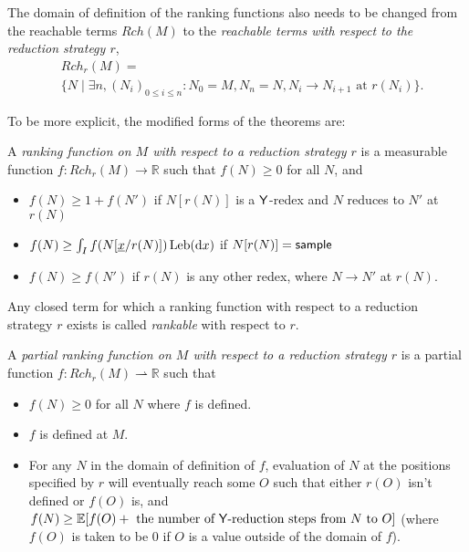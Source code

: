 The domain of definition of the ranking functions also needs to be changed from the reachable terms $Rch(M)$ to the \emph{reachable terms with respect to the reduction strategy $r$},
\begin{align*}
& Rch_r(M) = \\ & \{N \mid \exists n, (N_i)_{0 \leq i \leq n}: N_0 = M, N_n = N, N_i \to N_{i+1} \text{ at } r(N_i)\}.
\end{align*}

To be more explicit, the modified forms of the theorems are:
\begin{definition}\rm
A \emph{ranking function on $M$ with respect to a reduction strategy $r$} is a measurable function $f:\mathit{Rch}_r(M) \to \mathbb{R}$ such that $f(N) \geq 0$ for all $N$, and
\begin{itemize}
    \item $f(N) \geq 1+ f(N')$ if $N[r(N)]$ is a $\mathsf{Y}$-redex and $N$ reduces to $N'$ at $r(N)$
    \item $f(N) \geq \int_I f(N[\underline{x}/r(N)]) \, \mathrm{Leb}(\mathrm{d}x)$ if $N[r(N)] = \mathsf{sample}$

    \item $f(N) \geq f(N')$ if $r(N)$ is any other redex, where $N \to N'$ at $r(N)$.
\end{itemize}
Any closed term for which a ranking function with respect to a reduction strategy $r$ exists is called \emph{rankable} with respect to $r$. 
\end{definition}

\begin{definition}
A \emph{partial ranking function on $M$ with respect to a reduction strategy $r$} is a partial function $f : Rch_r(M) \rightharpoonup \mathbb R$ such that
\begin{itemize}
    \item $f(N) \geq 0$ for all $N$ where $f$ is defined.
    \item $f$ is defined at $M$.
    \item For any $N$ in the domain of definition of $f$, evaluation of $N$ at the positions specified by $r$ will eventually reach some $O$ such that either $r(O)$ isn't defined or $f(O)$ is, and $f(N) \geq \mathbb E[f(O) + \text{ the number of $\mathsf{Y}$-reduction steps from $N$ to $O$}]$ (where $f(O)$ is taken to be 0 if $O$ is a value outside of the domain of $f$).
\end{itemize}
\end{definition}

